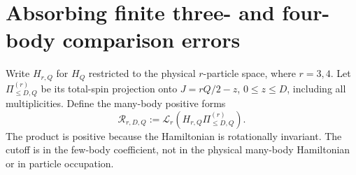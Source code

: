 \documentclass[11pt]{article}
\begin{document}
\section{Absorbing finite three- and four-body comparison errors}
Write $H_{r,Q}$ for $H_Q$ restricted to the physical $r$-particle space,
where $r=3,4$. Let $\Pi^{(r)}_{\le D,Q}$ be its total-spin projection onto
$J=rQ/2-z$, $0\le z\le D$, including all multiplicities. Define the
many-body positive forms
\begin{equation}
 \mathcal R_{r,D,Q}:=\mathcal L_r(H_{r,Q}\Pi^{(r)}_{\le D,Q}).
\end{equation}
The product is positive because the Hamiltonian is rotationally invariant.
The cutoff is in the few-body coefficient, not in the physical many-body
Hamiltonian or in particle occupation.
\end{document}
